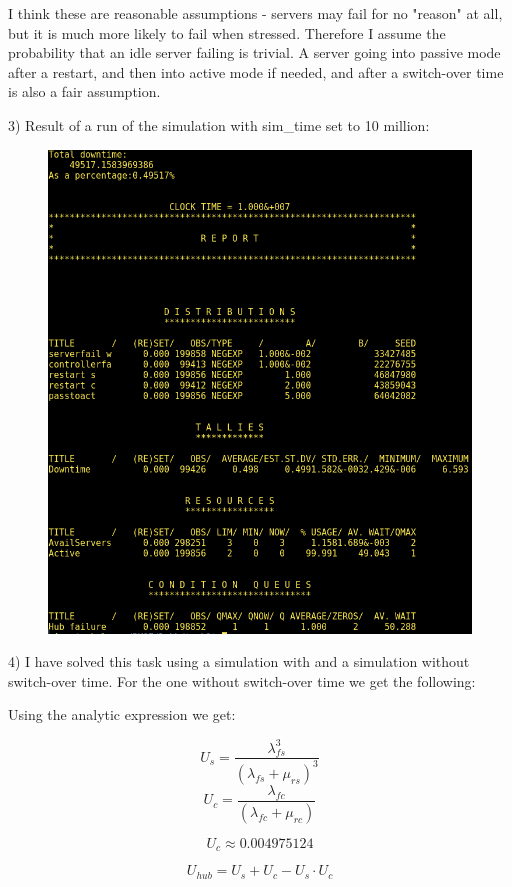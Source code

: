 \documentclass[11pt]{article}
\begin{document}
I think these are reasonable assumptions - servers may fail for no "reason" at all, but it is much more likely to fail when stressed. Therefore I assume the probability that an idle server failing is trivial. A server going into passive mode after a restart, and then into active mode if needed, and after a switch-over time is also a fair assumption.

3)
Result of a run of the simulation with sim\_time set to 10 million:

\begin{figure}[H]
	\includegraphics[width=\textwidth]{demos_2-2.png}
	\centering
\end{figure}

4) I have solved this task using a simulation with and a simulation without switch-over time. For the one without switch-over time we get the following:

Using the analytic expression we get:

$$U_s = \frac{\lambda_{fs}^3}{(\lambda_{fs} + \mu_{rs})^3}$$
$$U_c = \frac{\lambda_{fc}}{(\lambda_{fc} + \mu_{rc})}$$

$$U_c \approx 0.004975124$$

$$U_{hub} = U_s + U_c - U_s \cdot U_c$$
\end{document}
